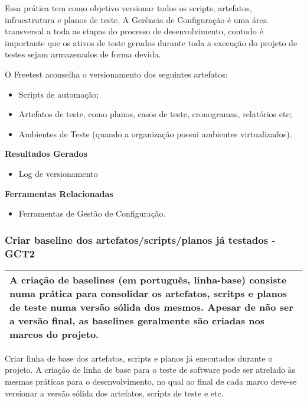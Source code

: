 Essa prática tem como objetivo versionar todos os scripts, artefatos, infraestrutura e planos de teste. A Gerência de Configuração é uma área transversal a toda as etapas do processo de desenvolvimento, contudo é importante que os ativos de teste gerados durante toda a execução do projeto de testes sejam armazenados de forma devida.

O Freetest aconselha o versionamento dos seguintes artefatos:

\begin{itemize}
    \item Scripts de automação;
    \item Artefatos de teste, como planos, casos de teste, cronogramas, relatórios etc;
    \item Ambientes de Teste (quando a organização possui ambientes virtualizados).
\end{itemize}

\textbf{Resultados Gerados}
\begin{itemize}
    \item Log de versionamento
\end{itemize}

\textbf{Ferramentas Relacionadas }
\begin{itemize}
    \item Ferramentas de Gestão de Configuração.
\end{itemize}

\subsubsection{Criar baseline dos artefatos/scripts/planos já testados - GCT2 }
\label{sec:gct2}

\begin{table}[!ht]
\centering
\begin{tabular}{|p{130mm}|}
\hline
A criação de baselines (em português, linha-base) consiste numa prática para consolidar os artefatos, scritps e planos de teste numa versão sólida dos mesmos. Apesar de não ser a versão final, as baselines geralmente são criadas nos marcos do projeto. \\ 
\hline
\end{tabular}
\end{table}

Criar linha de base dos artefatos, scripts e planos já executados durante o projeto. A criação de linha de base para o teste de software pode ser atrelado às mesmas práticas para o desenvolvimento, no qual ao final de cada marco deve-se versionar a versão sólida dos artefatos, scripts de teste e etc.

